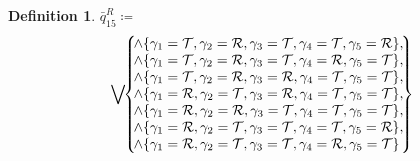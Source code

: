 \documentclass[twoside,twocolumn,a4paper,11pt]{article}
\theoremstyle{definition}
\newtheorem{defn}[theorem]{Definition}
\begin{document}
\begin{defn}%
\label{def:notq15R}
$\bar{q}_{15}^R \coloneqq$
\begin{equation}
\label{eq:notq15R}
\bigvee\!\!
 \left\lbrace\!
  \begin{matrix}
   \land\{\gamma_1=\mathcal{T},\gamma_2=\mathcal{R},\gamma_3=\mathcal{T},\gamma_4=\mathcal{T},
   \gamma_5=\mathcal{R}\},\\
   \land\{\gamma_1=\mathcal{T},\gamma_2=\mathcal{R},\gamma_3=\mathcal{T},\gamma_4=\mathcal{R},
   \gamma_5=\mathcal{T}\},\vspace{0pt}\\
   \land\{\gamma_1=\mathcal{T},\gamma_2=\mathcal{R},\gamma_3=\mathcal{R},\gamma_4=\mathcal{T},
   \gamma_5=\mathcal{T}\},\\
   \land\{\gamma_1=\mathcal{R},\gamma_2=\mathcal{T},\gamma_3=\mathcal{R},\gamma_4=\mathcal{T},
   \gamma_5=\mathcal{T}\},\\
   \land\{\gamma_1=\mathcal{R},\gamma_2=\mathcal{R},\gamma_3=\mathcal{T},\gamma_4=\mathcal{T},
   \gamma_5=\mathcal{T}\},\\
   \land\{\gamma_1=\mathcal{R},\gamma_2=\mathcal{T},\gamma_3=\mathcal{T},\gamma_4=\mathcal{T},
   \gamma_5=\mathcal{R}\},\\
   \land\{\gamma_1=\mathcal{R},\gamma_2=\mathcal{T},\gamma_3=\mathcal{T},\gamma_4=\mathcal{R},
   \gamma_5=\mathcal{T}\}\;\\
  \end{matrix}\!
 \right\rbrace\!\!
\end{equation}
\end{defn}
\end{document}
